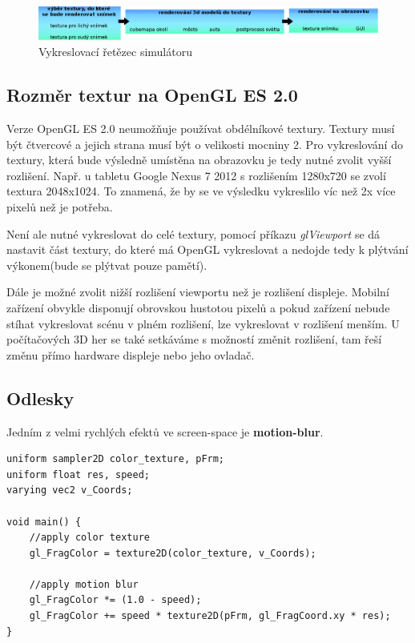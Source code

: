 \documentclass[11pt,twoside,a4paper]{book}
\begin{document}
\begin{figure}[h!]
\includegraphics[width=150mm]{figures/render-schema.png}
\caption{Vykreslovací řetězec simulátoru}
\end{figure}

\subsection{Rozměr textur na OpenGL ES 2.0}
Verze OpenGL ES 2.0 neumožňuje používat obdélníkové textury. Textury musí být čtvercové a jejich strana musí být o velikosti mocniny 2.
Pro vykreslování do textury, která bude výsledně umístěna na obrazovku je tedy nutné zvolit vyšší rozlišení. Např. u tabletu Google Nexus 7 2012 s rozlišením 1280x720 se zvolí textura 2048x1024. To znamená, že by se ve výsledku vykreslilo víc než 2x více pixelů než je potřeba.

Není ale nutné vykreslovat do celé textury, pomocí příkazu \textit{glViewport} se dá nastavit část textury, do které má OpenGL vykreslovat a nedojde tedy k plýtvání výkonem(bude se plýtvat pouze pamětí).

Dále je možné zvolit nižší rozlišení viewportu než je rozlišení displeje. Mobilní zařízení obvykle disponují obrovskou hustotou pixelů a pokud zařízení nebude stíhat vykreslovat scénu v plném rozlišení, lze vykreslovat v rozlišení menším. U počítačových 3D her se také setkáváme s možností změnit rozlišení, tam řeší změnu přímo hardware displeje nebo jeho ovladač.

\subsection{Odlesky}

Jedním z velmi rychlých efektů ve screen-space je \textbf{motion-blur}.
\lstset{language=GLSL} 
\begin{lstlisting}[caption=Motion blur fragment shader dle rychlosti vozidla]
uniform sampler2D color_texture, pFrm;
uniform float res, speed;
varying vec2 v_Coords;

void main() {
	//apply color texture
	gl_FragColor = texture2D(color_texture, v_Coords); 

	//apply motion blur
	gl_FragColor *= (1.0 - speed);
	gl_FragColor += speed * texture2D(pFrm, gl_FragCoord.xy * res);
}
\end{lstlisting}
\end{document}
